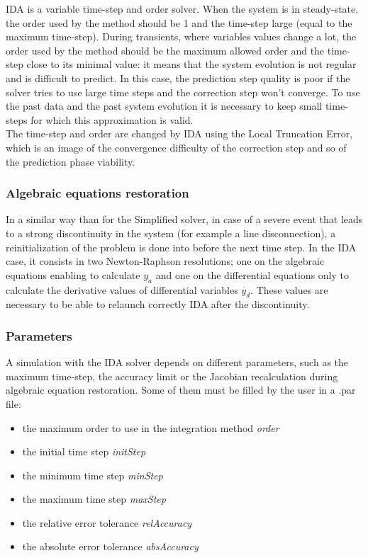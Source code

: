 \documentclass[a4paper, 12pt]{report}
\begin{document}
\ac{IDA} is a variable time-step and order solver. When the system is in steady-state, the order used by the method should be 1 and the time-step large (equal to the maximum time-step). During transients, where variables values change a lot, the order used by the method should be the maximum allowed order and the time-step close to its minimal value: it means that the system evolution is not regular and is difficult to predict. In this case, the prediction step quality is poor if the solver tries to use large time steps and the correction step won't converge. To use the past data and the past system evolution it is necessary to keep small time-steps for which this approximation is valid. \\

The time-step and order are changed by \ac{IDA} using the Local Truncation Error, which is an image of the convergence difficulty of the correction step and so of the prediction phase viability.

\subsubsection{Algebraic equations restoration}

In a similar way than for the Simplified solver, in case of a severe event that leads to a strong discontinuity in the system (for example a line disconnection), a reinitialization of the problem is done into \Dynawo before the next time step.
In the \ac{IDA} case, it consists in two Newton-Raphson resolutions; one on the algebraic equations enabling to calculate $y_a$ and one on the differential equations only to calculate the derivative values of differential variables $\dot{y_d}$. These values are necessary to be able to relaunch correctly \ac{IDA} after the discontinuity.

\subsubsection{Parameters}

A simulation with the \ac{IDA} solver depends on different parameters, such as the maximum time-step, the accuracy limit or the Jacobian recalculation during algebraic equation restoration. Some of them must be filled by the user in a .par file:
\begin{itemize}
\item the maximum order to use in the integration method \textit{order}
\item the initial time step \textit{initStep}
\item the minimum time step \textit{minStep}
\item the maximum time step \textit{maxStep}
\item the relative error tolerance \textit{relAccuracy}
\item the absolute error tolerance \textit{absAccuracy}
\end{itemize}
\end{document}
